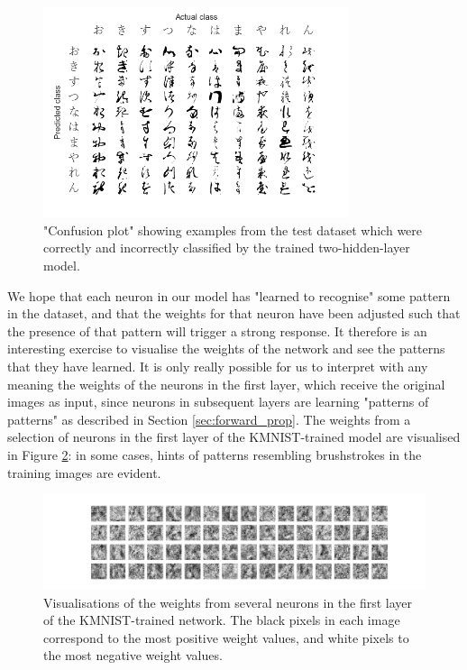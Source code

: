 \documentclass{article}[11pt]
\begin{document}
        
        \begin{figure}[h]
            \includegraphics[width=0.8\textwidth, center]{kmnist_confusion}
            \caption{"Confusion plot" showing examples from the test dataset which were correctly and incorrectly classified by the trained two-hidden-layer model.}
            \label{fig:kmnist_confusion}
        \end{figure}
        
        
        We hope that each neuron in our model has "learned to recognise" some pattern in the dataset, and that the weights for that neuron have been adjusted such that the presence of that pattern will trigger a strong response. It therefore is an interesting exercise to visualise the weights of the network and see the patterns that they have learned. It is only really possible for us to interpret with any meaning the weights of the neurons in the first layer, which receive the original images as input, since neurons in subsequent layers are learning "patterns of patterns" as described in Section \ref{sec:forward_prop}. The weights from a selection of neurons in the first layer of the KMNIST-trained model are visualised in Figure \ref{fig:kmnist_neurons}: in some cases, hints of patterns resembling brushstrokes in the training images are evident.
        
        
        \begin{figure}[h]
            \includegraphics[width=1.2\textwidth, center]{kmnist_neurons}
            \caption{Visualisations of the weights from several neurons in the first layer of the KMNIST-trained network. The black pixels in each image correspond to the most positive weight values, and white pixels to the most negative weight values.}
            \label{fig:kmnist_neurons}
        \end{figure}
\end{document}
